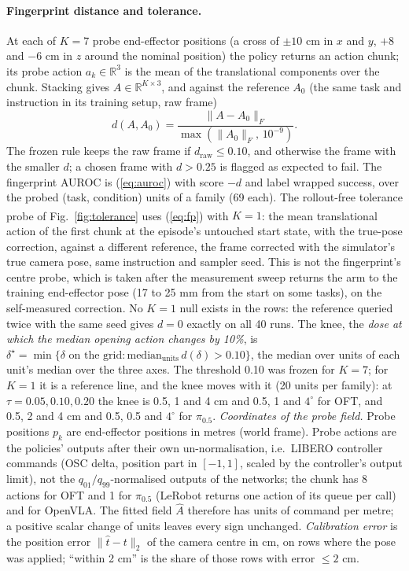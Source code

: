 \documentclass{article}
\newcommand{\pihalf}{$\pi_{0.5}$}
\newcommand{\ph}{\textsuperscript{\dag}}
\begin{document}
\paragraph{Fingerprint distance and tolerance.} At each of $K = 7$ probe end-effector positions (a cross of $\pm 10$ cm
in $x$ and $y$, $+8$ and $-6$ cm in $z$ around the nominal position) the policy returns an action chunk; its probe action
$a_k \in \mathbb{R}^3$ is the mean of the translational components over the chunk. Stacking gives $A \in
\mathbb{R}^{K\times 3}$, and against the reference $A_0$ (the same task and instruction in its training setup, raw frame)
\begin{equation}
d(A, A_0) = \frac{\|A - A_0\|_F}{\max(\|A_0\|_F,\, 10^{-9})} .
\label{eq:fp}
\end{equation}
The frozen rule keeps the raw frame if $d_{\mathrm{raw}} \le 0.10$, and otherwise the frame with the smaller $d$; a
chosen frame with $d > 0.25$ is flagged as expected to fail. The fingerprint AUROC is (\ref{eq:auroc}) with score $-d$
and label wrapped success, over the probed (task, condition) units of a family (69 each).
The rollout-free tolerance probe\ph{} of Fig.~\ref{fig:tolerance} uses (\ref{eq:fp}) with $K = 1$: the mean
translational action of the first chunk at the episode's untouched start state, with the true-pose correction, against
a different reference, the frame corrected with the simulator's true camera pose, same instruction and sampler seed.
This is not the fingerprint's centre probe, which is taken after the measurement sweep
returns the arm to the training end-effector pose (17 to 25 mm from the start on some tasks), on the self-measured
correction. No $K = 1$ null exists in the rows: the reference queried twice with the same seed gives $d = 0$ exactly on
all 40 runs. The knee, the \emph{dose at which the median opening action changes by 10\%}, is $\delta^\star =
\min\{\delta \text{ on the grid} : \mathrm{median}_{\text{units}}\, d(\delta) > 0.10\}$, the median over units of each
unit's median over the three axes. The threshold 0.10 was frozen for $K = 7$; for $K = 1$ it is a reference line, and
the knee moves with it
(20 units per family): at $\tau = 0.05, 0.10, 0.20$ the knee is
0.5, 1 and 4 cm and 0.5, 1 and $4^\circ$ for OFT, and 0.5, 2 and 4 cm and 0.5, 0.5 and $4^\circ$ for \pihalf. \emph{Coordinates of the probe field.} Probe positions $p_k$ are end-effector
positions in metres (world frame). Probe actions are the policies' outputs after their own un-normalisation, i.e.\
LIBERO controller commands (OSC delta, position part in $[-1,1]$, scaled by the controller's output limit), not the
$q_{01}/q_{99}$-normalised outputs of the networks; the chunk has 8 actions for OFT and 1 for \pihalf{} (LeRobot returns one action of its queue per call) and for OpenVLA. The fitted field $\hat A$ therefore has units of command per metre; a positive scalar change of units leaves every sign unchanged.
\emph{Calibration error} is the position error $\|\hat t - t\|_2$ of the camera centre in cm, on rows where the pose was applied; ``within 2 cm'' is the share of those rows with error $\le 2$ cm.
\end{document}
